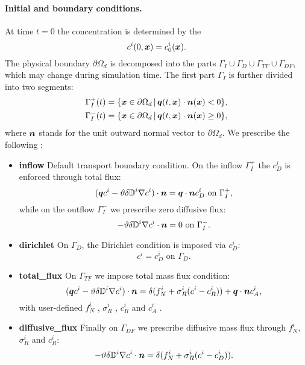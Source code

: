 \paragraph{Initial and boundary conditions.}
At time $t=0$ the concentration is determined by the 
$$ c^i(0,\mathbf{\boldsymbol{x}}) = c^i_0(\mathbf{\boldsymbol{x}}). $$
The physical boundary $\partial\Omega_d$ is decomposed into the parts $\Gamma_I\cup\Gamma_D\cup\Gamma_{TF}\cup\Gamma_{DF}$, which may change during simulation time.
The first part $\Gamma_I$ is further divided into two segments:
\begin{align*}
\Gamma_I^+(t) &= \{\mathbf{\boldsymbol{x}}\in \partial\Omega_d\,|\, \mathbf{\boldsymbol{q}}(t,\mathbf{\boldsymbol{x}})\cdot\mathbf{\boldsymbol{n}}(\mathbf{\boldsymbol{x}})<0\},\\
\Gamma_I^-(t) &= \{\mathbf{\boldsymbol{x}}\in \partial\Omega_d\,|\, \mathbf{\boldsymbol{q}}(t,\mathbf{\boldsymbol{x}})\cdot\mathbf{\boldsymbol{n}}(\mathbf{\boldsymbol{x}})\ge 0\},
\end{align*}
where $\mathbf{\boldsymbol{n}}$ stands for the unit outward normal vector to $\partial\Omega_d$.
We prescribe the following :
\begin{itemize}
\item \textbf{inflow} Default transport boundary condition. On the inflow $\Gamma_I^+$ the  $c_D^i$  is enforced through total flux:
$$ (\mathbf{\boldsymbol{q}} c^i - \vartheta\delta{{\mathbb{D}}}^i\nabla c^i)\cdot\mathbf{\boldsymbol{n}} = \mathbf{\boldsymbol{q}}\cdot\mathbf{\boldsymbol{n}} c_D^i \mbox{ on }\Gamma_I^+, $$
while on the outflow $\Gamma_I^-$ we prescribe zero diffusive flux:
$$ -\vartheta\delta{{\mathbb{D}}}^i\nabla c^i\cdot\mathbf{\boldsymbol{n}} = 0 \mbox{ on }\Gamma_I^-. $$
\item \textbf{dirichlet} On $\Gamma_D$, the Dirichlet condition is imposed via  $c_D^i$:
$$ c^i = c^i_D \mbox{ on }\Gamma_D. $$
\item \textbf{total\_flux}
On $\Gamma_{TF}$ we impose total mass flux condition:
$$ (\mathbf{\boldsymbol{q}} c^i - \vartheta\delta{{\mathbb{D}}}^i\nabla c^i)\cdot\mathbf{\boldsymbol{n}} = \delta(f^i_N + \sigma^i_R(c^i-c^i_R))+\mathbf{\boldsymbol{q}}\cdot\mathbf{\boldsymbol{n}} c^i_A, $$
with user-defined  $f^i_N$ ,
 $\sigma^i_R$ ,
 $c^i_R$  and  $c^i_A$ .
\item \textbf{diffusive\_flux} Finally on $\Gamma_{DF}$ we prescribe diffusive mass flux through  $f^i_N$,  $\sigma^i_R$ and  $c^i_R$:
$$ -\vartheta\delta{{\mathbb{D}}}^i\nabla c^i\cdot\mathbf{\boldsymbol{n}} = \delta(f^i_N+\sigma^i_R(c^i-c^i_D)). $$
\end{itemize}






